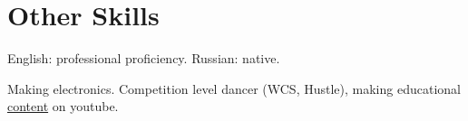 \documentclass{article}
\begin{document}
 
\section{Other Skills}
\begin{description}[widest=Langauges]
\item[Languages] English: professional proficiency.  Russian: native.
\item[Hobbies] Making electronics. Competition level dancer (WCS, Hustle), making educational \href{https://www.youtube.com/channel/UCAjmXQnYQjWoVHx6NIo24CQ}{content} on youtube.
\end{description}
\end{document}
